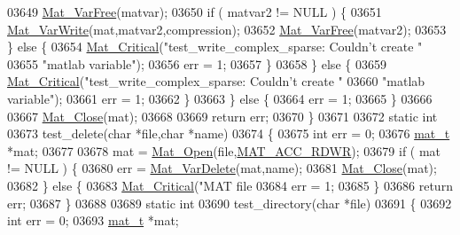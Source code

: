 \begin{DoxyCode}
{{{{{{{{{{{{{{{{{{{{{{{{{{{{{{{{{{{{{{{{{{{{{{{{{{{{{{{{{{{{03649             \hyperlink{group___m_a_t_ga1d14716f7450530fd1c9d02413787f0e}{Mat\_VarFree}(matvar);
03650             \textcolor{keywordflow}{if} ( matvar2 != NULL ) \{
03651                 \hyperlink{group___m_a_t_ga4bd3eba12df415d8226e27c457fbbb0b}{Mat\_VarWrite}(mat,matvar2,compression);
03652                 \hyperlink{group___m_a_t_ga1d14716f7450530fd1c9d02413787f0e}{Mat\_VarFree}(matvar2);
03653             \} \textcolor{keywordflow}{else} \{
03654                 \hyperlink{group__mat__util_gaf51f2bfbb5580f575e4dd79757e2b80c}{Mat\_Critical}(\textcolor{stringliteral}{"test\_write\_complex\_sparse: Couldn't create "}
03655                          \textcolor{stringliteral}{"matlab variable"});
03656                 err = 1;
03657             \}
03658         \} \textcolor{keywordflow}{else} \{
03659             \hyperlink{group__mat__util_gaf51f2bfbb5580f575e4dd79757e2b80c}{Mat\_Critical}(\textcolor{stringliteral}{"test\_write\_complex\_sparse: Couldn't create "}
03660                          \textcolor{stringliteral}{"matlab variable"});
03661             err = 1;
03662         \}
03663     \} \textcolor{keywordflow}{else} \{
03664         err = 1;
03665     \}
03666 
03667     \hyperlink{group___m_a_t_ga101c92ff7bde4a2d4615661beba09262}{Mat\_Close}(mat);
03668 
03669     \textcolor{keywordflow}{return} err;
03670 \}
03671 
03672 \textcolor{keyword}{static} \textcolor{keywordtype}{int}
03673 test\_delete(\textcolor{keywordtype}{char} *file,\textcolor{keywordtype}{char} *name)
03674 \{
03675     \textcolor{keywordtype}{int} err = 0;
03676     \hyperlink{struct__mat__t}{mat\_t} *mat;
03677 
03678     mat = \hyperlink{group___m_a_t_gafbfedb5636a99f0ef867520c47f77d18}{Mat\_Open}(file,\hyperlink{group___m_a_t_ggaa9dcbc70f538af79bd557593ff6b5cdba0f65f27ea42fde32d62b702b82329c1f}{MAT\_ACC\_RDWR});
03679     \textcolor{keywordflow}{if} ( mat != NULL ) \{
03680         err = \hyperlink{group___m_a_t_gabf139e48d48177e5069338fa2919c60a}{Mat\_VarDelete}(mat,name);
03681         \hyperlink{group___m_a_t_ga101c92ff7bde4a2d4615661beba09262}{Mat\_Close}(mat);
03682     \} \textcolor{keywordflow}{else} \{
03683         \hyperlink{group__mat__util_gaf51f2bfbb5580f575e4dd79757e2b80c}{Mat\_Critical}(\textcolor{stringliteral}{"MAT file %
03684         err = 1;
03685     \}
03686     \textcolor{keywordflow}{return} err;
03687 \}
03688 
03689 \textcolor{keyword}{static} \textcolor{keywordtype}{int}
03690 test\_directory(\textcolor{keywordtype}{char} *file)
03691 \{
03692     \textcolor{keywordtype}{int} err = 0;
03693     \hyperlink{struct__mat__t}{mat\_t} *mat;
}}}}}}}}}}}}}}}}}}}}}}}}}}}}}}}}}}}}}}}}}}}}}}}}}}}}}}}}}}}}}
\end{DoxyCode}
